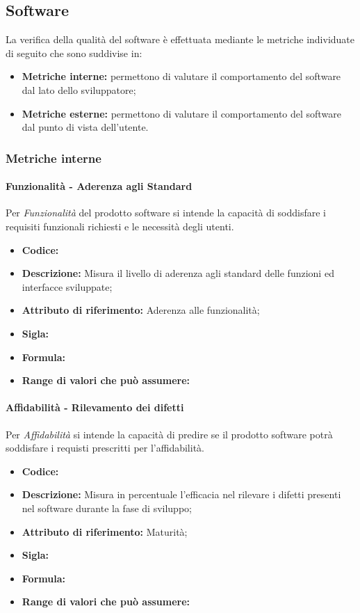 \subsection{Software}
La verifica della qualità del software è effettuata mediante le metriche individuate di seguito che sono suddivise in:

\begin{itemize}
    \item \textbf{Metriche interne:} permettono di valutare il comportamento del software dal lato dello sviluppatore;
    \item \textbf{Metriche esterne:} permettono di valutare il comportamento del software dal punto di vista dell'utente.
\end{itemize}


\subsubsection{Metriche interne}
\paragraph{Funzionalità - Aderenza agli Standard}
Per \textit{Funzionalità} del prodotto software si intende la capacità di soddisfare i requisiti funzionali richiesti e le necessità degli utenti.

\begin{itemize}
    \item \textbf{Codice:} 
    \item \textbf{Descrizione:} Misura il livello di aderenza agli standard delle funzioni ed interfacce sviluppate;
    \item \textbf{Attributo di riferimento:} Aderenza alle funzionalità;
    \item \textbf{Sigla:}
    \item \textbf{Formula:}
    \item \textbf{Range di valori che può assumere:}
\end{itemize}


\paragraph{Affidabilità - Rilevamento dei difetti}
Per \textit{Affidabilità} si intende la capacità di predire se il prodotto software potrà soddisfare i requisti prescritti per l'affidabilità.

\begin{itemize}
    \item \textbf{Codice:} 
    \item \textbf{Descrizione:} Misura in percentuale l'efficacia nel rilevare i difetti presenti nel software durante la fase di sviluppo;
    \item \textbf{Attributo di riferimento:} Maturità;
    \item \textbf{Sigla:}
    \item \textbf{Formula:}
    \item \textbf{Range di valori che può assumere:}
\end{itemize}


